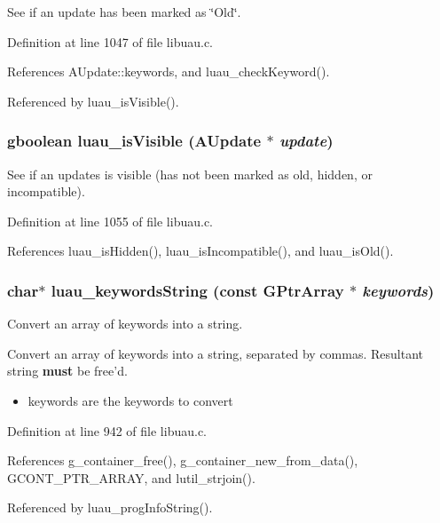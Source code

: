 See if an update has been marked as \char`\"{}Old\char`\"{}. 



Definition at line 1047 of file libuau.c.

References AUpdate::keywords, and luau\_\-check\-Keyword().

Referenced by luau\_\-is\-Visible().
\subsubsection{\setlength{\rightskip}{0pt plus 5cm}gboolean luau\_\-is\-Visible ({\bf AUpdate} $\ast$ {\em update})}\label{libuau_8h_a84}


See if an updates is visible (has not been marked as old, hidden, or incompatible). 



Definition at line 1055 of file libuau.c.

References luau\_\-is\-Hidden(), luau\_\-is\-Incompatible(), and luau\_\-is\-Old().
\subsubsection{\setlength{\rightskip}{0pt plus 5cm}char$\ast$ luau\_\-keywords\-String (const GPtr\-Array $\ast$ {\em keywords})}\label{libuau_8h_a66}


Convert an array of keywords into a string. 

Convert an array of keywords into a string, separated by commas. Resultant string {\bf must} be free'd.

\begin{itemize}
\item keywords are the keywords to convert 
\end{itemize}


Definition at line 942 of file libuau.c.

References g\_\-container\_\-free(), g\_\-container\_\-new\_\-from\_\-data(), GCONT\_\-PTR\_\-ARRAY, and lutil\_\-strjoin().

Referenced by luau\_\-prog\-Info\-String().
